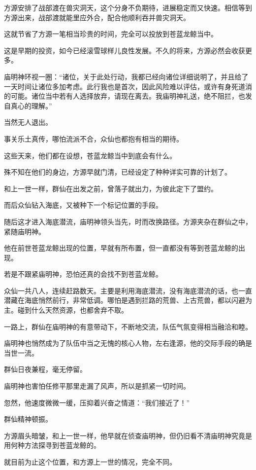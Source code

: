 \begin{this_body}
方源安排了战部渡在兽灾洞天，这个分身不负期待，进展稳定而又快速。相信等到方源出来，战部渡就能里应外合，配合他顺利吞并兽灾洞天。

这就节省了方源一笔相当珍贵的时间，完全可以投放到苍蓝龙鲸当中。

这是早期的投资，如今已经滚雪球样儿良性发展。不久的将来，方源必然会收获更多。

庙明神环视一圈：“诸位，关于此处行动，我都已经向诸位详细说明了，并且给了一天时间让诸位多加考虑。此行我也是首次，因此风险难以评估，或许有身死道消的可能。诸位当中若有人选择放弃，请现在离去。我庙明神礼送，绝不阻拦，也发自真心的理解。”

当然无人退出。

事关乐土真传，哪怕流派不合，众仙也都抱有相当的期待。

这些天来，他们都在设想，苍蓝龙鲸当中到底会有什么。

殊不知在他们的身边，方源早就门清，已经设定了种种详实可靠的计划了。

和上一世一样，群仙在出发之前，曾落子就出力，为彼此定下了盟约。

而后众仙钻入海底，又被种下一个标记位置的手段。

随后这才进入海底潜流，庙明神领头当先，时而改换路径。方源夹杂在群仙之中，紧随庙明神。

他在前世苍蓝龙鲸出现的位置，早就有所布置，但一直都没有等到苍蓝龙鲸的出现。

若是不跟紧庙明神，恐怕还真的会找不到苍蓝龙鲸。

众仙一共八人，连续赶路数天。主要是利用海底潜流，没有海底潜流的话，也一直潜藏在海底悄然前行，非常低调。哪怕是遇到拦路的荒兽、上古荒兽，都以闪避为主。碰到什么天然资源，也都舍弃不取。

一路上，群仙在庙明神的有意带动下，不断地交流，队伍气氛变得相当融洽和睦。

庙明神也悄然成为了队伍中当之无愧的核心人物，左右逢源，他的交际手段的确是当世一流。

群仙日夜兼程，毫无停留。

庙明神也害怕任修平那里走漏了风声，所以是抓紧一切时间。

忽然，他速度微微一缓，压抑着兴奋之情道：“我们接近了！”

群仙精神顿振。

方源眉头暗皱，和上一世一样，他早就在侦查庙明神，但仍旧看不清庙明神究竟是用何种方法探寻到苍蓝龙鲸的。

就目前为止这个位置，和方源上一世的情况，完全不同。


\end{this_body}
